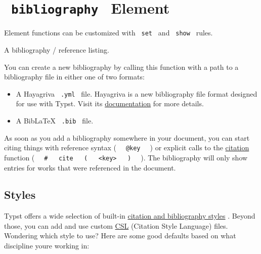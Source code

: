 \section{\texorpdfstring{\texttt{\ bibliography\ } {{ Element
}}}{ bibliography   Element }}\label{summary}

\label{element-tooltip}
Element functions can be customized with \texttt{\ set\ } and
\texttt{\ show\ } rules.

A bibliography / reference listing.

You can create a new bibliography by calling this function with a path
to a bibliography file in either one of two formats:

\begin{itemize}
\tightlist
\item
  A Hayagriva \texttt{\ .yml\ } file. Hayagriva is a new bibliography
  file format designed for use with Typst. Visit its
  \href{https://github.com/typst/hayagriva/blob/main/docs/file-format.md}{documentation}
  for more details.
\item
  A BibLaTeX \texttt{\ .bib\ } file.
\end{itemize}

As soon as you add a bibliography somewhere in your document, you can
start citing things with reference syntax (
\texttt{\ }{\texttt{\ @key\ }}\texttt{\ } ) or explicit calls to the
\href{/docs/reference/model/cite/}{citation} function (
\texttt{\ }{\texttt{\ \#\ }}\texttt{\ }{\texttt{\ cite\ }}\texttt{\ }{\texttt{\ (\ }}\texttt{\ }{\texttt{\ \textless{}key\textgreater{}\ }}\texttt{\ }{\texttt{\ )\ }}\texttt{\ }
). The bibliography will only show entries for works that were
referenced in the document.

\subsection{Styles}\label{styles}

Typst offers a wide selection of built-in
\href{/docs/reference/model/bibliography/\#parameters-style}{citation
and bibliography styles} . Beyond those, you can add and use custom
\href{https://citationstyles.org/}{CSL} (Citation Style Language) files.
Wondering which style to use? Here are some good defaults based on what
discipline you\textquotesingle re working in:

